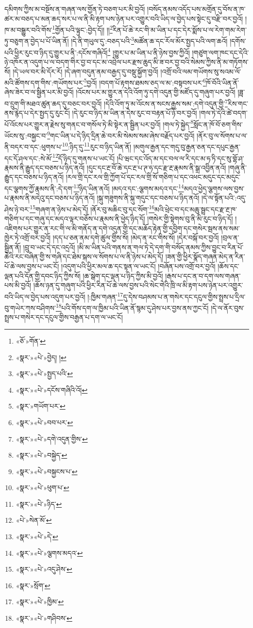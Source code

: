 དམིགས་ཀྱིས་མ་བསྔོས་ན་གཞན་ལས་གྱོན་ཏེ་བཅག་པར་མི་བྱའོ། །བསོད་ནམས་འདོད་པས་མགྲོན་དུ་བོས་ན་ཁ་ཚར་མ་བཅད་པ་མན་ཆད་སར་པ་ལ་ནི་མི་རྟག་པས་ཉེན་པར་འགྱུར་བའི་ཡིད་ལ་བྱེད་པས་སྟེང་དུ་བརྫི་བར་བྱའོ། །ཁ་མ་བསྒྱུར་བའི་གོས་\footnote{«ཅོ་»གོན་}གྱོན་པའི་ལྟུང་:བྱེད་དོ།། །།\footnote{«སྣར་»«པེ་»བྱེད། །}རིན་པོ་ཆེ་རང་གི་མ་ཡིན་པ་དང་དེར་སྨོས་པ་ལ་རེག་གམ་རེག་ཏུ་བཅུག་ན་བྱེད་པ་པོ་ཡིན་ནོ། །དེ་ནི་གཡུལ་དུ་:བཅད་པའི་\footnote{«སྣར་»«པེ་»སྤྱད་པའི་}མཚོན་ཆ་དང་རོལ་མོར་སྤྱད་པའི་ལག་ཆའོ། །དགོས་པའི་ཕྱིར་རུང་བ་ཉིད་དུ་གྱུར་པ་ནི་:དངོས་གཞིའོ།\footnote{«སྣར་»«པེ་»དངོས་གཞིའི་འོ།} །གྱུར་པ་མ་ཡིན་པ་ནི་ཉེས་བྱས་ཀྱིའོ། །གཙུག་ལག་ཁང་དང་དེའི་ཉེ་འཁོར་ན་འདུག་པ་ལ་བདག་གིར་བྱ་བ་དང་མ་འབྲེལ་པར་རྫས་ཆུད་མི་ཟ་བར་བྱ་བའི་སེམས་ཀྱིས་ནི་མ་གཏོགས་སོ། །དེ་ཡལ་བར་མི་དོར་རོ། །དེ་ཞག་བདུན་ནམ་བརྒྱད་དུ་བསྡུ་སྐྱོག་བྱའོ། །འགྲོ་བའི་ལམ་གཡོགས་སུ་སའམ་ལོ་མའི་ཚོགས་དག་གིས་:གཡོགས་པར་\footnote{«སྣར་»གཡོག་པར་}བྱའོ། །བདག་པོ་རྟགས་ཐམས་ཅད་ལ་མ་:བསྟབས་པར་\footnote{«སྣར་»«པེ་»བབ་པར་}ཁོ་བོའི་ཡིན་ནོ་ཞེས་ཟེར་བ་ལ་སྦྱིན་པར་མི་བྱའོ། །འོངས་པར་མ་གྱུར་ན་དེའི་འོག་ཏུ་དགེ་འདུན་གྱི་མཛོད་དུ་གཞུག་པར་བྱའོ། །ཟླ་བ་དྲུག་གི་མཐའ་ཚུན་ཆད་དུ་བཅང་བར་བྱའོ། །དེའི་འོག་ཏུ་མ་འོངས་ན་སངས་རྒྱས་སམ་:དགེ་འདུན་གྱི་\footnote{«སྣར་»«པེ་»དགེ་འདུན་གྱིས་}རིས་གང་ནས་རྙེད་པ་དེར་སྤྱད་དུ་རུང་ངོ། །དེ་རུང་བ་ཉིད་མ་ཡིན་ན་དེས་རུང་བ་བརྟན་པོ་ཉོ་བར་བྱའོ། །གལ་ཏེ་དེའི་ཚེ་བདག་པོ་འོངས་པར་གྱུར་ན་རྗེས་སུ་གནང་བ་གསོལ་ཏེ་མི་སྟེར་ན་སྦྱིན་པར་བྱའོ། །གལ་ཏེ་སྐྱེད་\footnote{«སྣར་»«པེ་»བསྐྱེད་}སློང་ན་ཁོ་བོ་ཅག་གིས་ཡོངས་སུ་:བསྐྱང་བ་\footnote{«སྣར་»«པེ་»བསྐྱངས་པ་}གང་ཡིན་པ་དེ་ཉིད་དྲིན་ཆེ་བར་མི་སེམས་སམ་ཞེས་བརྗོད་པར་བྱའོ། །ནོར་བུ་ལ་སོགས་པ་ལ་ནི་བདར་བ་དང་:ཕུགས་པ་\footnote{«སྣར་»«པེ་»ཕུག་པ་}:ཉིད་དུ་\footnote{«སྣར་»«པེ་»ཉིད་}རུང་བ་ཉིད་ཡིན་ནོ། །མགུལ་རྒྱན་དང་གདུ་བུ་རྒྱན་ཅན་དང་དཔུང་རྒྱན་དང་དོ་ཤལ་དང་:སེ་མོ་\footnote{«པེ་»སེན་མོ་}དོ་ཉིད་དུ་གནས་པ་ཡང་ངོ། །པི་ཝང་དང་འོད་མ་དང་བལ་ལ་རི་དང་མ་ཧ་ཏི་དང་སུ་གྷོ་ཤ་རྣམས་ནི་རྒྱུད་དང་བཅས་པ་ཉིད་ནའོ། །དུང་དང་རྔ་བོ་ཆེ་དང་རྔ་པ་ཊ་ཧ་དང་རྫ་རྔ་རྣམས་ནི་སྒྲ་འབྱིན་ནའོ། །གཞུ་ནི་རྒྱུད་དང་བཅས་པ་ཉིད་ནའོ། །རལ་གྲི་དང་རལ་གྲི་ཀྱོག་པོ་དང་རལ་གྲི་སོ་གཅིག་པ་དང་འཕང་མདུང་དང་མདུང་དང་ལྕགས་ཀྱོ་རྣམས་ནི་:དེ་དག་\footnote{«སྣར་»«པེ་»དེ་}ཉིད་ཡིན་ནའོ། །མདའ་དང་:ལྕགས་མདའ་དང་\footnote{«སྣར་»«པེ་»ལྕགས་མདའ་}མདའ་ཕྱེད་ལྕགས་ལས་བྱས་པ་རྣམས་ནི་མདེའུ་དང་བཅས་པ་ཉིད་ནའོ། །སྐུ་གཟུགས་ནི་སྐུ་གདུང་དང་བཅས་པ་ཉིད་ནའོ། །དེ་ལ་སྟོན་པའི་:འདུ་ཤེས་ཉེ་བར་\footnote{«སྣར་»«པེ་»འདུ་ཤེས་}གཞག་ན་ཉེས་པ་མེད་དོ། །ནོར་བུ་མཆིང་བུ་དང་སོག་\footnote{«སྣར་»སྲོག་}མའི་ཕྲེང་བ་དང་མཆུ་སྦྲང་དང་རྫ་རྔ་ཁ་གཅིག་པ་དང་གཞུ་དང་མདའ་ལྟར་བཅོས་པ་རྣམས་ནི་ཕྱེད་ཉིད་དོ། །གསེར་གྱི་སྟེགས་བུ་ནི་མི་རུང་བ་ཉིད་དོ། །འཇིགས་པར་གྱུར་ན་རང་གི་ལ་མི་གནོད་ན་དགེ་འདུན་གྱི་དང་མཆོད་རྟེན་གྱི་དབྱིག་དང་གསེར་སྦས་ནས་སམ་ཁྱེར་ཏེ་འགྲོ་བར་བྱའོ། །དད་པ་ཅན་ནམ་དགེ་ཚུལ་གྱིས་སོ། །མེད་ན་རང་གིས་སོ། །དེར་བསྐོ་བར་བྱའོ། །བྲལ་ན་སྦྱིན་ནོ། །བྲུ་བ་ཡང་དེ་དང་འདྲའོ། །མི་མ་ཡིན་པའི་གནས་ན་གལ་ཏེ་དེ་དག་གི་བསོད་ནམས་ཀྱིས་བྱུང་བ་རིན་པོ་ཆེའི་རང་བཞིན་གྱི་ས་གཞི་དང་ཐེམ་སྐས་ལ་སོགས་པ་ལ་ནི་ཉེས་པ་མེད་དོ། །ཟན་གྱི་ཕྱིར་སྣོད་གཞན་མེད་ན་རིན་པོ་ཆེ་ལས་བྱས་པ་ཡང་ངོ། །འདུག་པའི་ཕྱིར་མལ་ཆ་དང་སྟན་ལ་ཡང་ངོ། །བཞོན་པས་འགྲོ་བར་བྱའོ། །ཆོས་དང་ལྡན་པའི་དོན་གྱི་དབང་ཉིད་ཀྱིས་སོ། །ཆ་སྒེག་དང་ལྡན་པ་ཉིད་ཀྱིས་མི་བྱའོ། །རྒས་པ་དང་ན་བ་དག་ལས་གཞན་པས་མི་བྱའོ། །ཆོས་ཉན་དུ་གཞུག་པའི་ཕྱིར་རིན་པོ་ཆེ་ལས་བྱས་པའི་སེང་གེའི་ཁྲི་ལ་མི་རྟག་པས་ཉེན་པར་འགྱུར་བའི་ཡིད་ལ་བྱེད་པས་འདུག་པར་བྱའོ། །:ཁྱིམ་གཞན་\footnote{«སྣར་»«པེ་»ཁྱིམ་}དུ་དེས་བཤམས་པ་ན་གསེར་དང་དངུལ་གྱིས་སྤྲས་པ་དྲིལ་བུ་གཡེར་ཀས་བཤིགས་\footnote{«སྣར་»«པེ་»གཤིབས་}པའི་གོས་དག་ལ་ཁྱིམ་པའི་ཡིན་ནོ་སྙམ་དུ་ཤེས་པར་བྱས་ནས་ཀྱང་ངོ། །དེ་ལ་ནོར་བུས་སྤྲས་པ་གསེར་དང་དངུལ་གྱིས་བརྒྱན་པ་དག་ལ་ཡང་ངོ། 